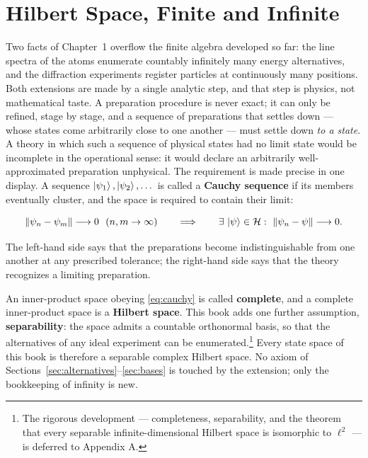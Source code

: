 \section{Hilbert Space, Finite and Infinite}
\label{sec:hilbert}

Two facts of Chapter~1 overflow the finite algebra developed so far: the line spectra of the atoms enumerate countably infinitely many energy alternatives, and the diffraction experiments register particles at continuously many positions. Both extensions are made by a single analytic step, and that step is physics, not mathematical taste. A preparation procedure is never exact; it can only be refined, stage by stage, and a sequence of preparations that settles down --- whose states come arbitrarily close to one another --- must settle down \emph{to a state}. A theory in which such a sequence of physical states had no limit state would be incomplete in the operational sense: it would declare an arbitrarily well-approximated preparation unphysical. The requirement is made precise in one display. A sequence $\ket{\psi_1},\ket{\psi_2},\dots$ is called a \textbf{Cauchy sequence} if its members eventually cluster, and the space is required to contain their limit:
\begin{linenomath}
    \begin{equation}
        \|\psi_n-\psi_m\|\longrightarrow 0
        \ \ (n,m\to\infty)
        \qquad\Longrightarrow\qquad
        \exists\,\ket{\psi}\in\mathcal{H}:\ \|\psi_n-\psi\|\longrightarrow 0 .
        \label{eq:cauchy}
    \end{equation}
\end{linenomath}
The left-hand side says that the preparations become indistinguishable from one another at any prescribed tolerance; the right-hand side says that the theory recognizes a limiting preparation.

An inner-product space obeying \eqref{eq:cauchy} is called \textbf{complete}, and a complete inner-product space is a \textbf{Hilbert space}. This book adds one further assumption, \textbf{separability}: the space admits a countable orthonormal basis, so that the alternatives of any ideal experiment can be enumerated.\footnote{The rigorous development --- completeness, separability, and the theorem that every separable infinite-dimensional Hilbert space is isomorphic to $\ell^2$ --- is deferred to Appendix A.} Every state space of this book is therefore a separable complex Hilbert space. No axiom of Sections~\ref{sec:alternatives}--\ref{sec:bases} is touched by the extension; only the bookkeeping of infinity is new.


